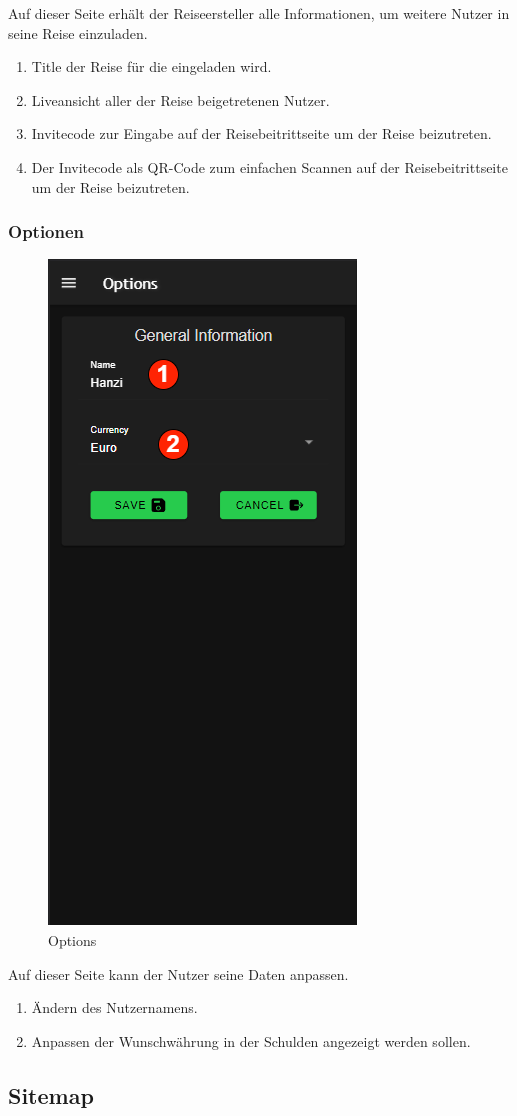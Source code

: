 Auf dieser Seite erhält der Reiseersteller alle Informationen, um weitere Nutzer in seine Reise einzuladen.

\begin{enumerate}[label=\protect\circled{\arabic*}]
	\item Title der Reise für die eingeladen wird.
	\item Liveansicht aller der Reise beigetretenen Nutzer.
	\item Invitecode zur Eingabe auf der Reisebeitrittseite um der Reise beizutreten.
	\item Der Invitecode als QR-Code zum einfachen Scannen auf der Reisebeitrittseite um der Reise beizutreten.
\end{enumerate}

\subsubsection{Optionen}\label{options}
\begin{figure}[H]
	\centering
	\includegraphics[width=0.3
		\textwidth]{img/pages_numbers/options.drawio}
	\caption[Options]{Options}
	\label{fig:options}
\end{figure}

Auf dieser Seite kann der Nutzer seine Daten anpassen.

\begin{enumerate}[label=\protect\circled{\arabic*}]
	\item Ändern des Nutzernamens.
	\item Anpassen der Wunschwährung in der Schulden angezeigt werden sollen.
\end{enumerate}


\subsection{Sitemap}

